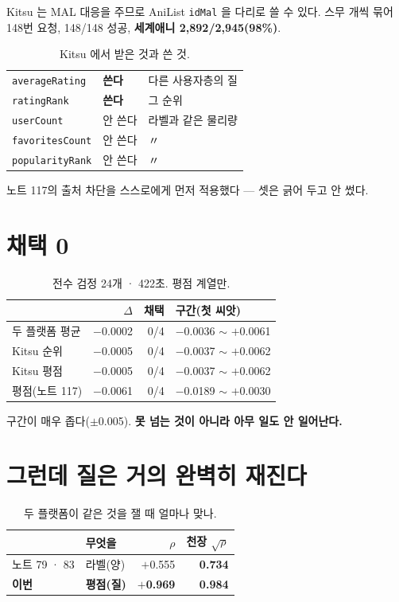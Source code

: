 \documentclass[10pt]{article}
\begin{document}
Kitsu 는 MAL 대응을 주므로 AniList \texttt{idMal} 을 다리로 쓸 수 있다.
스무 개씩 묶어 148번 요청, 148/148 성공, \textbf{세계애니 2,892/2,945(98\%)}.

\begin{table}[t]
\centering\tsize
\caption{Kitsu 에서 받은 것과 쓴 것.}
\begin{tabular}{lll}
\toprule
\texttt{averageRating} & \textbf{쓴다} & 다른 사용자층의 질 \\
\texttt{ratingRank} & \textbf{쓴다} & 그 순위 \\
\midrule
\texttt{userCount} & 안 쓴다 & 라벨과 같은 물리량 \\
\texttt{favoritesCount} & 안 쓴다 & 〃 \\
\texttt{popularityRank} & 안 쓴다 & 〃 \\
\bottomrule
\end{tabular}
\end{table}

노트 117의 출처 차단을 스스로에게 먼저 적용했다 --- 셋은 긁어 두고 안 썼다.

\section{채택 0}

\begin{table}[t]
\centering\tsize
\caption{전수 검정 24개 · 422초. 평점 계열만.}
\begin{tabular}{lrrl}
\toprule
& $\Delta$ & 채택 & 구간(첫 씨앗) \\
\midrule
두 플랫폼 평균 & $-$0.0002 & 0/4 & $-$0.0036 $\sim$ $+$0.0061 \\
Kitsu 순위 & $-$0.0005 & 0/4 & $-$0.0037 $\sim$ $+$0.0062 \\
Kitsu 평점 & $-$0.0005 & 0/4 & $-$0.0037 $\sim$ $+$0.0062 \\
평점(노트 117) & $-$0.0061 & 0/4 & $-$0.0189 $\sim$ $+$0.0030 \\
\bottomrule
\end{tabular}
\end{table}

구간이 매우 좁다($\pm$0.005). \textbf{못 넘는 것이 아니라 아무 일도 안
일어난다.}

\section{그런데 질은 거의 완벽히 재진다}

\begin{table}[t]
\centering\tsize
\caption{두 플랫폼이 같은 것을 잴 때 얼마나 맞나.}
\begin{tabular}{llrr}
\toprule
& 무엇을 & $\rho$ & 천장 $\sqrt{\rho}$ \\
\midrule
노트 79 · 83 & 라벨(양) & $+$0.555 & \textbf{0.734} \\
\textbf{이번} & \textbf{평점(질)} & \textbf{$+$0.969} & \textbf{0.984} \\
\bottomrule
\end{tabular}
\end{table}
\end{document}
